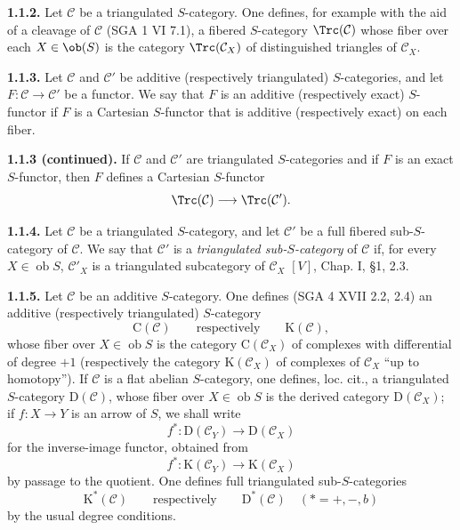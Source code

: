 \documentclass[11pt]{article}
\providecommand{\cC}{\mathcal C}
\providecommand{\Coker}{\operatorname{Coker}}
\providecommand{\Ker}{\operatorname{Ker}}
\providecommand{\cO}{\mathcal O}
\begin{document}
\textbf{1.1.2.} Let \(\mathcal C\) be a triangulated \(S\)-category. One defines, for example with the aid of a cleavage of \(\mathcal C\) (SGA 1 VI 7.1), a fibered \(S\)-category \(\Trc(\mathcal C)\) whose fiber over each \(X\in \ob(S)\) is the category \(\Trc(\mathcal C_X)\) of distinguished triangles of \(\mathcal C_X\).

\textbf{1.1.3.} Let \(\mathcal C\) and \(\mathcal C'\) be additive (respectively triangulated) \(S\)-categories, and let \(F:\mathcal C\to\mathcal C'\) be a functor. We say that \(F\) is an additive (respectively exact) \(S\)-functor if \(F\) is a Cartesian \(S\)-functor that is additive (respectively exact) on each fiber.



\providecommand{\cC}{\mathcal C}
\providecommand{\cD}{\mathcal D}
\providecommand{\cK}{\mathcal K}
\providecommand{\cO}{\mathcal O}
\providecommand{\cS}{\mathcal S}
\providecommand{\Cpx}{\mathrm C}
\providecommand{\Kpx}{\mathrm K}
\providecommand{\Dpx}{\mathrm D}
\providecommand{\D}{\mathrm D}
\providecommand{\Ho}{\mathrm H}
\providecommand{\RHom}{\mathrm R\!\operatorname{Hom}}
\providecommand{\Ob}{\operatorname{ob}}
\providecommand{\Coker}{\operatorname{Coker}}
\providecommand{\Ker}{\operatorname{Ker}}
\providecommand{\Im}{\operatorname{Im}}
\providecommand{\Hom}{\operatorname{Hom}}
\providecommand{\Cone}{\operatorname{Cone}}
\providecommand{\id}{\operatorname{Id}}
\providecommand{\qis}{\xrightarrow{\sim}}


\textbf{1.1.3 (continued).} If \(\mathcal C\) and \(\mathcal C'\) are triangulated \(S\)-categories and if \(F\) is an exact \(S\)-functor, then \(F\) defines a Cartesian \(S\)-functor
\[
  \Trc(\mathcal C)\longrightarrow \Trc(\mathcal C').
\]

\textbf{1.1.4.} Let \(\mathcal C\) be a triangulated \(S\)-category, and let \(\mathcal C'\) be a full fibered sub-\(S\)-category of \(\mathcal C\). We say that \(\mathcal C'\) is a \emph{triangulated sub-\(S\)-category} of \(\mathcal C\) if, for every \(X\in\Ob S\), \(\mathcal C'_X\) is a triangulated subcategory of \(\mathcal C_X\) \([V]\), Chap. I, §1, 2.3.

\textbf{1.1.5.} Let \(\mathcal C\) be an additive \(S\)-category. One defines (SGA 4 XVII 2.2, 2.4) an additive (respectively triangulated) \(S\)-category
\[
  \Cpx(\mathcal C)\qquad\text{respectively}\qquad \Kpx(\mathcal C),
\]
whose fiber over \(X\in\Ob S\) is the category \(\Cpx(\mathcal C_X)\) of complexes with differential of degree \(+1\) (respectively the category \(\Kpx(\mathcal C_X)\) of complexes of \(\mathcal C_X\) ``up to homotopy''). If \(\mathcal C\) is a flat abelian \(S\)-category, one defines, loc. cit., a triangulated \(S\)-category \(\Dpx(\mathcal C)\), whose fiber over \(X\in\Ob S\) is the derived category \(\Dpx(\mathcal C_X)\); if \(f:X\to Y\) is an arrow of \(S\), we shall write
\[
  f^*:\Dpx(\mathcal C_Y)\longrightarrow \Dpx(\mathcal C_X)
\]
for the inverse-image functor, obtained from
\[
  f^*:\Kpx(\mathcal C_Y)\longrightarrow \Kpx(\mathcal C_X)
\]
by passage to the quotient. One defines full triangulated sub-\(S\)-categories
\[
  \Kpx^*(\mathcal C)\qquad\text{respectively}\qquad \Dpx^*(\mathcal C)
  \quad (*=+,-,b)
\]
by the usual degree conditions.
\end{document}
